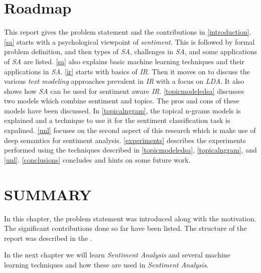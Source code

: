 
\section{Roadmap}\label{sec:roadmap}
\par
This report gives the problem statement and the contributions in \cref{introduction}. \cref{sa} starts with a psychological viewpoint of \textit{sentiment}. 
This is followed by formal problem definition, and then types of \textit{SA}, challenges in \textit{SA}, and some applications of \textit{SA} are
listed. \cref{sa} also explains basic machine learning techniques and their applications in \textit{SA}. \cref{ir} starts with basics of \textit{IR}. 
Then it moves on to discuss the various \textit{text modeling} approaches prevalent in \textit{IR} with a focus on \textit{LDA}. It also shows how \textit{SA}
can be used for sentiment aware \textit{IR}. \cref{topicmodeledsa} discusses two models which combine sentiment and topics. The pros and cons of these models have 
been discussed. In \cref{topicalngram}, the topical n-grams models is explained and a technique to use it for the sentiment classification task is expalined. 
\cref{unl} focuses on the second aspect of this research which is make use of deep semantics for sentiment analysis. \cref{experiments} describes the experiments 
performed using the techniques described in \cref{topicmodeledsa}, \cref{topicalngram}, and \cref{unl}. \cref{conclusions} concludes and hints on some future work.

\section*{SUMMARY}

In this chapter, the problem statement was introduced along with the motivation. The significant contributions done so far have been listed.
The structure of the report was described in the .

In the next chapter we will learn \textit{Sentiment Analysis} and several machine learning techniques and how these are used in \textit{Sentiment Analysis}.

\clearpage

